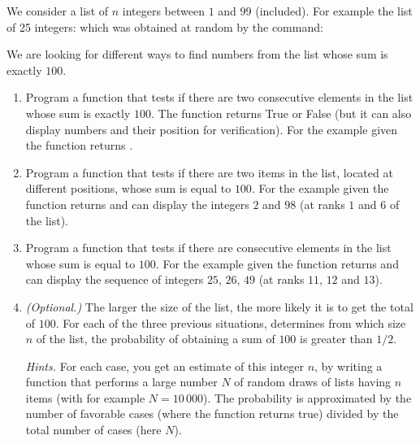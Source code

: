 \documentclass[11pt,class=report,crop=false]{standalone}
\begin{document}
\begin{activite}


We consider a list of $n$ integers between $1$ and $99$ (included).
For example the list of 25 integers:
\mycenterline{\ci{[16,2,85,27,9,45,98,73,12,26,46,25,26,49,18,99,10,86,7,42]}}
which was obtained at random by the command:

We are looking for different ways to find numbers from the list whose sum is exactly $100$.

\begin{enumerate}
  \item Program a function  that tests if there are two consecutive elements in the list whose sum is exactly $100$. The function returns \og{}True\fg{} or \og{}False\fg{} (but it can also display numbers and their position for verification). For the example given the function returns .
  
  \item Program a function  that tests if there are two items in the list, located at different positions, whose sum is equal to $100$. 
 For the example given the function returns  and can display the integers $2$ and $98$ (at ranks $1$ and $6$ of the list). 
 
 
  \item Program a function  that tests if there are consecutive elements in the list whose sum is equal to $100$. 
 For the example given the function returns  and can display the sequence of integers $25$, $26$, $49$ (at ranks $11$, $12$ and $13$).
 
 \item \emph{(Optional.)} The larger the size of the list, the more likely it is to get the total of $100$. For each of the three previous situations, determines from which size $n$ of the list, the probability of obtaining a sum of $100$ is greater than $1/2$. 
 
  \emph{Hints.} For each case, you get an estimate of this integer $n$, by writing a function  that performs a large number $N$ of random draws of lists having $n$ items (with for example $N=10\,000$). The probability is approximated by the number of favorable cases (where the function returns true) divided by the total number of cases (here $N$).
 
 
  
\end{enumerate}

\end{activite}
\end{document}
